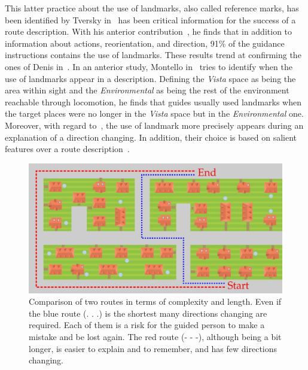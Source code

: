 This latter practice about the use of landmarks, also called reference marks, has been identified by Tversky in~\cite{tversky_1999_pictorial} has been critical information for the success of a route description. With his anterior contribution~\cite{tversky_1998_space}, he finds that in addition to information about actions, reorientation, and direction, 91\% of the guidance instructions contains the use of landmarks. These results trend at confirming the ones of Denis in~\cite{denis_1997_description}. In an anterior study, Montello in~\cite{montello_1993_scale} tries to identify when the use of landmarks appear in a description. Defining the \textit{Vista} space as being the area within sight and the \textit{Environmental} as being the rest of the environment reachable through locomotion, he finds that guides usually used landmarks when the target places were no longer in the \textit{Vista} space but in the \textit{Environmental} one. Moreover, with regard to~\cite{tversky_1999_pictorial}, the use of landmark more precisely appears during an explanation of a direction changing. In addition, their choice is based on salient features over a route description~\cite{nothegger_2004_selection}.

\begin{figure}[ht!]
\centering
\includegraphics[scale=0.22]{figures/chapter3/landscape/landscape.png}
\caption{\label{fig:chap3_shortest} Comparison of two routes in terms of complexity and length. Even if the blue route (. . .) is the shortest many directions changing are required. Each of them is a risk for the guided person to make a mistake and be lost again. The red route (- - -), although being a bit longer, is easier to explain and to remember, and has few directions changing.}
\end{figure}


